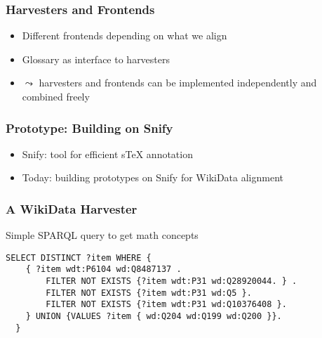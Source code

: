 \documentclass[aspectratio=169]{beamer}
\begin{document}
\begin{frame}
    \frametitle{Harvesters and Frontends}
    \vspace{2em}\par
    \begin{itemize}
        \item Different frontends depending on what we align
        \item Glossary as interface to harvesters
        \item $\leadsto$ harvesters and frontends can be implemented independently and combined freely
    \end{itemize}
\end{frame}

\begin{frame}
    \frametitle{Prototype: Building on Snify}
    \begin{itemize}
        \item Snify: tool for efficient sTeX annotation
        \item Today: building prototypes on Snify for WikiData alignment
    \end{itemize}
\end{frame}

\begin{frame}[fragile]
    \frametitle{A WikiData Harvester}
    {\centering Simple SPARQL query to get math concepts\vspace{2em}\par}
    \begin{lstlisting}[language=SPARQL]
SELECT DISTINCT ?item WHERE {
    { ?item wdt:P6104 wd:Q8487137 .
        FILTER NOT EXISTS {?item wdt:P31 wd:Q28920044. } .
        FILTER NOT EXISTS {?item wdt:P31 wd:Q5 }.
        FILTER NOT EXISTS {?item wdt:P31 wd:Q10376408 }.
    } UNION {VALUES ?item { wd:Q204 wd:Q199 wd:Q200 }}. 
  }
    \end{lstlisting}
\end{frame}
\end{document}
